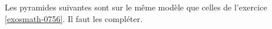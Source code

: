
\begin{exercice}\label{exosmath-0757}


    Les pyramides suivantes sont sur le même modèle que celles de l'exercice \ref{exosmath-0756}. Il faut les compléter.


    \begin{multicols}{2}


\begin{center}
   
\end{center}

\columnbreak

\begin{center}
   
\end{center}


    \end{multicols}

\end{exercice}
